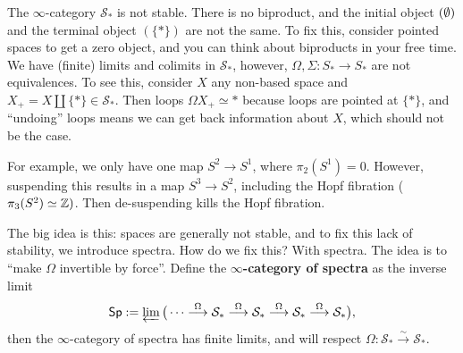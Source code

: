 \begin{example}
    The $\infty$-category $\mathcal{S}_* $ is not stable. There is no biproduct, and the initial object $(\emptyset)$ and the terminal object $(\{*\} )$ are not the same. To fix this, consider pointed spaces to get a zero object, and you can think about biproducts in your free time. We have (finite) limits and colimits in $\mathcal{S} _*$, however, $\Omega,\Sigma \colon S_* \to S_*$ are not equivalences. To see this, consider $X$ any non-based space and $X_+ =X\amalg \{*\} \in \mathcal S_* $. Then loops $\Omega X_+ \simeq *$ because loops are pointed at $\{*\} $, and ``undoing'' loops means we can get back information about $X$, which should not be the case.
    
    For example, we only have one map $S ^2 \to S^1 $, where $\pi_2(S^1 )=0$. However, suspending this results in a map $S^3\to S^2$, including the Hopf fibration ($\pi_3(S^2)\simeq \mathbb{Z} )$. Then de-suspending kills the Hopf fibration.
\end{example}
\orbreak
The big idea is this: spaces are generally not stable, and to fix this lack of stability, we introduce spectra. How do we fix this? With spectra. The idea is to ``make $\Omega$ invertible by force''. Define the $\mathbf \infty$\textbf{-category of spectra} as the inverse limit \[
    \mathsf{Sp}:= \varprojlim \big( \cdots  \overset{\Omega}{\longrightarrow} \mathcal S_*\overset{\Omega}{\longrightarrow} \mathcal S_*\overset{\Omega}{\longrightarrow} \mathcal S_*\overset{\Omega}{\longrightarrow} \mathcal S_*\big),
\] then the $\infty$-category of spectra has finite limits, and  will respect $\Omega \colon \mathcal{S} _* \overset{\sim}{\to}  \mathcal{S_*} $.

